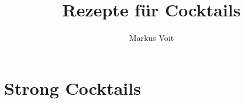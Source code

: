 \documentclass[
  DIV=11,%
  pagesize,%
  fontsize=11pt,
  paper=a4,%
  numbers=noenddot,
]{scrartcl}
\title{Rezepte für Cocktails}
\author{Markus Voit}
\begin{document}
\maketitle
\clearpage
\tableofcontents
\clearpage

\section{Strong Cocktails}
\newpage
\newpage
\newpage
\end{document}
